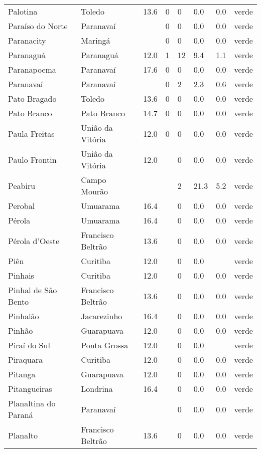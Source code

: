 \begin{longtable}{l|lllllll}
  Palotina & Toledo & 13.6 & 0 & 0 & 0.0 & 0.0 & verde \\ 
  Paraíso do Norte & Paranavaí &  & 0 & 0 & 0.0 & 0.0 & verde \\ 
  Paranacity & Maringá &  & 0 & 0 & 0.0 & 0.0 & verde \\ 
  Paranaguá & Paranaguá & 12.0 & 1 & 12 & 9.4 & 1.1 & verde \\ 
  Paranapoema & Paranavaí & 17.6 & 0 & 0 & 0.0 & 0.0 & verde \\ 
  Paranavaí & Paranavaí &  & 0 & 2 & 2.3 & 0.6 & verde \\ 
  Pato Bragado & Toledo & 13.6 & 0 & 0 & 0.0 & 0.0 & verde \\ 
  Pato Branco & Pato Branco & 14.7 & 0 & 0 & 0.0 & 0.0 & verde \\ 
  Paula Freitas & União da Vitória & 12.0 & 0 & 0 & 0.0 & 0.0 & verde \\ 
  Paulo Frontin & União da Vitória & 12.0 &  & 0 & 0.0 & 0.0 & verde \\ 
  Peabiru & Campo Mourão &  &  & 2 & 21.3 & 5.2 & verde \\ 
  Perobal & Umuarama & 16.4 &  & 0 & 0.0 & 0.0 & verde \\ 
  Pérola & Umuarama & 16.4 &  & 0 & 0.0 & 0.0 & verde \\ 
  Pérola d'Oeste & Francisco Beltrão & 13.6 &  & 0 & 0.0 & 0.0 & verde \\ 
  Piên & Curitiba & 12.0 &  & 0 & 0.0 &  & verde \\ 
  Pinhais & Curitiba & 12.0 &  & 0 & 0.0 & 0.0 & verde \\ 
  Pinhal de São Bento & Francisco Beltrão & 13.6 &  & 0 & 0.0 & 0.0 & verde \\ 
  Pinhalão & Jacarezinho & 16.4 &  & 0 & 0.0 & 0.0 & verde \\ 
  Pinhão & Guarapuava & 12.0 &  & 0 & 0.0 & 0.0 & verde \\ 
  Piraí do Sul & Ponta Grossa & 12.0 &  & 0 & 0.0 &  & verde \\ 
  Piraquara & Curitiba & 12.0 &  & 0 & 0.0 & 0.0 & verde \\ 
  Pitanga & Guarapuava & 12.0 &  & 0 & 0.0 & 0.0 & verde \\ 
  Pitangueiras & Londrina & 16.4 &  & 0 & 0.0 & 0.0 & verde \\ 
  Planaltina do Paraná & Paranavaí &  &  & 0 & 0.0 & 0.0 & verde \\ 
  Planalto & Francisco Beltrão & 13.6 &  & 0 & 0.0 & 0.0 & verde \\ 

\end{longtable}
